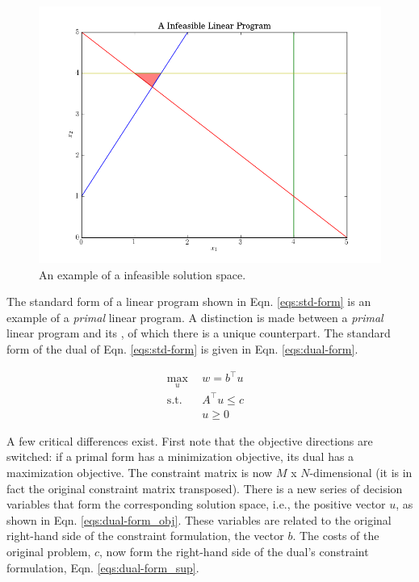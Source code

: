 \begin{figure}[H]
  \begin{center}
    \includegraphics[width=\linewidth]{./chapters/litreview/plots/infeasible.png}
  \caption{An example of a infeasible solution space.}
  \label{fig:infeasible}
  \end{center}
\end{figure}

The standard form of a linear program shown in Eqn. \ref{eqs:std-form} is an
example of a \textit{primal} linear program. A distinction is made between
a \textit{primal} linear program and its , of which there is a unique
counterpart. The standard form of the dual of Eqn. \ref{eqs:std-form} is given
in Eqn. \ref{eqs:dual-form}.

\begin{subequations}\label{eqs:dual-form}
  \begin{align}
    \max_{u} \:\: & 
    w = b^{\top} u
    & \label{eqs:dual-form_obj} \\
    \text{s.t.} \:\: &
    A^{\top} u \leq c 
    & \label{eqs:dual-form_sup} \\
    &
    u \geq 0
    &\label{eqs:dual-form_x}
  \end{align}
\end{subequations}

A few critical differences exist. First note that the objective directions are
switched: if a primal form has a minimization objective, its dual has a
maximization objective. The constraint matrix is now $M$ x $N$-dimensional (it
is in fact the original constraint matrix transposed). There is a new series of
decision variables that form the corresponding solution space, i.e., the
positive vector $u$, as shown in Eqn. \ref{eqs:dual-form_obj}. These variables
are related to the original right-hand side of the constraint formulation, the
vector $b$. The costs of the original problem, $c$, now form the right-hand side
of the dual's constraint formulation, Eqn. \ref{eqs:dual-form_sup}.

